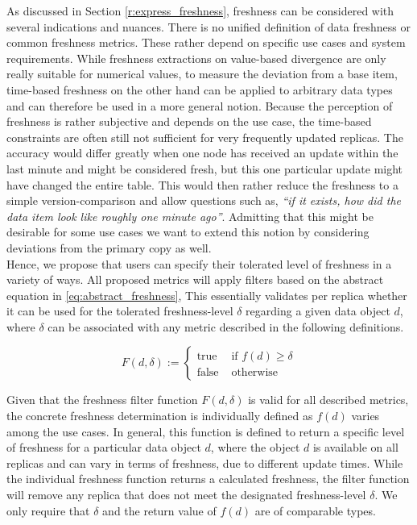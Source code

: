 As discussed in Section \ref{r:express_freshness}, freshness can be considered with several indications and nuances.
There is no unified definition of data freshness or common freshness metrics.
These rather depend on specific use cases and system requirements.
While freshness extractions on value-based divergence are only really suitable for numerical values,
to measure the deviation from a base item, time-based freshness on the other hand can be applied to arbitrary data types and can therefore be used 
in a more general notion.
Because the perception of freshness is rather subjective and depends on the use case, the time-based constraints are often still not sufficient for very frequently
updated replicas.
The accuracy would differ greatly when one node has received an update within the last minute and might be considered fresh, but this one particular 
update might have changed the entire table. 
This would then rather reduce the freshness to a simple version-comparison and allow questions such as, \textit{``if it exists, how did the data item look like roughly one minute ago''}.
Admitting that this might be desirable for some use cases we want to extend this notion by considering deviations from the primary copy as well.\\
Hence, we propose that users can specify their tolerated level of freshness in a variety of ways. 
All proposed metrics will apply filters based on the abstract equation in \ref{eq:abstract_freshness}, 
This essentially validates per replica whether it can be used for the tolerated freshness-level $\delta$ regarding a given data object $d$,
where $\delta$ can be associated with any metric described in the following definitions.

\begin{equation} \label{eq:abstract_freshness}
    F(d, \delta) :=
        \begin{cases}
            \text{true } & \text{if } f(d) \geq \delta\\
            \text{false } & \text{otherwise }
        \end{cases}
\end{equation}


Given that the freshness filter function $F(d, \delta)$ is valid for all described metrics, the concrete freshness determination is individually defined as $f(d)$ 
varies among the use cases.
In general, this function is defined to return a specific level of freshness for a particular data object $d$,
where the object $d$ is available on all replicas and can vary in terms of freshness, due to different update times.
While the individual freshness function returns a calculated freshness, the filter function will remove any replica that does not meet the designated freshness-level $\delta$. 
We only require that $\delta$ and the return value of $f(d)$ are of comparable types.


